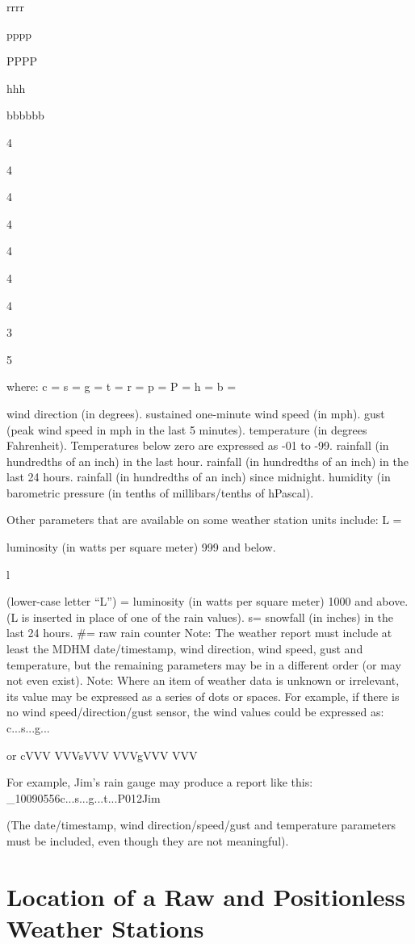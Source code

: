 rrrr

pppp

PPPP

hhh

bbbbbb

4

4

4

4

4

4

4

3

5


where: c =
s =
g =
t =
r =
p =
P =
h =
b =

wind direction (in degrees).
sustained one-minute wind speed (in mph).
gust (peak wind speed in mph in the last 5 minutes).
temperature (in degrees Fahrenheit). Temperatures below
zero are expressed as -01 to -99.
rainfall (in hundredths of an inch) in the last hour.
rainfall (in hundredths of an inch) in the last 24 hours.
rainfall (in hundredths of an inch) since midnight.
humidity (in %
barometric pressure (in tenths of millibars/tenths of hPascal).

Other parameters that are available on some weather station units include:
L =

luminosity (in watts per square meter) 999 and below.

l

(lower-case letter “L”) = luminosity (in watts per square meter)
1000 and above.
(L is inserted in place of one of the rain values).
s=
snowfall (in inches) in the last 24 hours.
#=
raw rain counter
Note: The weather report must include at least the MDHM date/timestamp,
wind direction, wind speed, gust and temperature, but the remaining
parameters may be in a different order (or may not even exist).
Note: Where an item of weather data is unknown or irrelevant, its value may
be expressed as a series of dots or spaces. For example, if there is no wind
speed/direction/gust sensor, the wind values could be expressed as:
c...s...g...

or cVVV
VVVsVVV
VVVgVVV
VVV

For example, Jim’s rain gauge may produce a report like this:
_10090556c...s...g...t...P012Jim

(The date/timestamp, wind direction/speed/gust and temperature parameters
must be included, even though they are not meaningful).


\section{Location of a Raw and Positionless Weather Stations}

